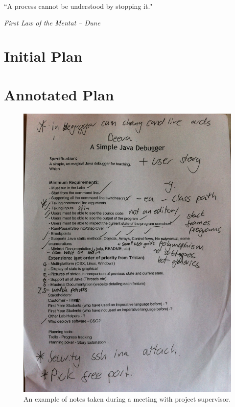 \documentclass[11pt, a4paper]{article}
\newlength\longest
\begin{document}
\clearpage
\thispagestyle{empty}
\null\vfill
\begin{center}
\settowidth{}
\parbox{\longest}{%
  \raggedright{%
  ``A process cannot be understood by stopping it." \\
  }   
  \raggedright{\emph{First Law of the Mentat -- Dune}}\par%
}
\end{center}
\vfill\vfill
\clearpage

\appendix
\section{Initial Plan}
\label{sec:initialplan}


\section{Annotated Plan}
\begin{figure}[h!]
\centering
\includegraphics[width=\textwidth]{annotatedreport.jpg}
\caption{An example of notes taken during a meeting with project supervisor.}
\end{figure}
\end{document}
